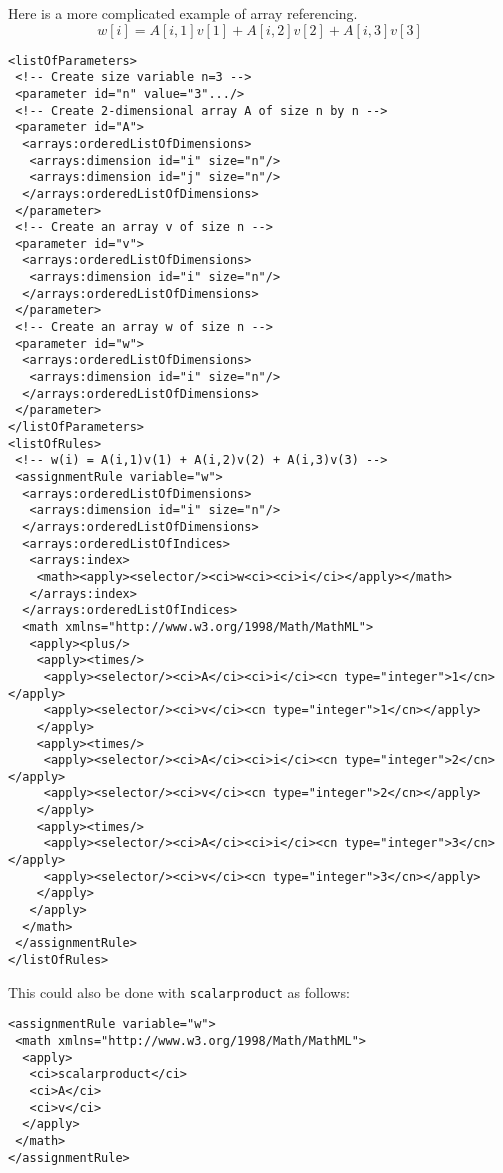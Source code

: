 
Here is a more complicated example of array referencing.
\begin{displaymath}
w[i]= A[i,1]v[1]+ A[i,2]v[2]+ A[i,3]v[3]
\end{displaymath}

\begin{verbatim}
<listOfParameters> 
 <!-- Create size variable n=3 -->
 <parameter id="n" value="3".../>
 <!-- Create 2-dimensional array A of size n by n -->
 <parameter id="A">
  <arrays:orderedListOfDimensions>
   <arrays:dimension id="i" size="n"/> 
   <arrays:dimension id="j" size="n"/>
  </arrays:orderedListOfDimensions> 
 </parameter> 
 <!-- Create an array v of size n -->
 <parameter id="v">
  <arrays:orderedListOfDimensions>
   <arrays:dimension id="i" size="n"/>
  </arrays:orderedListOfDimensions> 
 </parameter> 
 <!-- Create an array w of size n -->
 <parameter id="w">
  <arrays:orderedListOfDimensions>
   <arrays:dimension id="i" size="n"/>
  </arrays:orderedListOfDimensions> 
 </parameter>
</listOfParameters>
<listOfRules>
 <!-- w(i) = A(i,1)v(1) + A(i,2)v(2) + A(i,3)v(3) -->
 <assignmentRule variable="w">
  <arrays:orderedListOfDimensions>
   <arrays:dimension id="i" size="n"/>
  </arrays:orderedListOfDimensions> 
  <arrays:orderedListOfIndices>
   <arrays:index>
    <math><apply><selector/><ci>w<ci><ci>i</ci></apply></math>
   </arrays:index>
  </arrays:orderedListOfIndices>
  <math xmlns="http://www.w3.org/1998/Math/MathML">
   <apply><plus/>
    <apply><times/>
     <apply><selector/><ci>A</ci><ci>i</ci><cn type="integer">1</cn></apply>
     <apply><selector/><ci>v</ci><cn type="integer">1</cn></apply>
    </apply>
    <apply><times/>
     <apply><selector/><ci>A</ci><ci>i</ci><cn type="integer">2</cn></apply>
     <apply><selector/><ci>v</ci><cn type="integer">2</cn></apply>
    </apply>
    <apply><times/>
     <apply><selector/><ci>A</ci><ci>i</ci><cn type="integer">3</cn></apply>
     <apply><selector/><ci>v</ci><cn type="integer">3</cn></apply>
    </apply>
   </apply>
  </math>
 </assignmentRule>
</listOfRules>
\end{verbatim}

This could also be done with {\tt scalarproduct} as follows:

\begin{verbatim}
<assignmentRule variable="w">
 <math xmlns="http://www.w3.org/1998/Math/MathML">
  <apply>
   <ci>scalarproduct</ci>
   <ci>A</ci>
   <ci>v</ci>
  </apply>
 </math>
</assignmentRule>
\end{verbatim}

